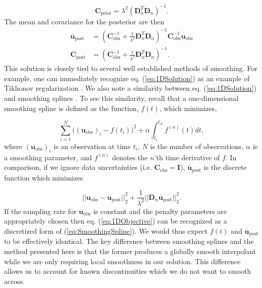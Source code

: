 \documentclass[10pt,a4paper]{article}
\begin{document}
\begin{equation}\label{eq:ExplicitPrior1D}
\mathbf{C_\mathrm{prior}} = \lambda^2(\mathbf{D}_n^T\mathbf{D}_n)^{-1}.
\end{equation}
The mean and covariance for the posterior are then 
\begin{equation}\label{eq:1DSolution}
\begin{split}
\mathbf{\bar{u}}_\mathrm{post} &= (\mathbf{C}_\mathrm{obs}^{-1} +   
                   \frac{1}{\lambda^2}\mathbf{D}_n^T\mathbf{D}_n)^{-1}\mathbf{C}_\mathrm{obs}^{-1}
                   \mathbf{u}_\mathrm{obs}
\\
\mathbf{C}_\mathrm{post} &= (\mathbf{C}_\mathrm{obs}^{-1} +   
                            \frac{1}{\lambda^2}\mathbf{D}_n^T\mathbf{D}_n)^{-1}.
\end{split}
\end{equation}
This solution is closely tied to several well established methods of smoothing.  For example, one can immediately recognize eq. (\ref{eq:1DSolution}) as an example of Tikhonov regularization \citep{Tikhonov1978}. We also note a similarity between eq. (\ref{eq:1DSolution}) and smoothing splines \citep{Wahba1990}.  To see this similarity, recall that a one-dimensional smoothing spline is defined as the function, $f(t)$, which minimizes,

\begin{equation}\label{eq:SmoothingSpline}
\sum_{i=1}^N \big((\mathbf{u_\mathrm{obs}})_i - f(t_i)\big)^2 + \alpha \int_{t_1}^{t_N} f^{(n)}(t) dt,
\end{equation}
where $(\mathbf{u_\mathrm{obs}})_i$ is an observation at time $t_i$, $N$ is the number of observations, $\alpha$ is a smoothing parameter, and $f^{(n)}$ denotes the $n$'th time derivative of $f$.
In comparison, if we ignore data uncertainties (i.e. $\mathbf{C}_\mathrm{obs}=\mathbf{I}$), $\mathbf{\bar{u}}_\mathrm{post}$ is the discrete function which minimizes  

\begin{equation}\label{eq:1DObjective}
||\mathbf{u}_\mathrm{obs} - \mathbf{\bar{u}}_\mathrm{post}||_2^2 + \frac{1}{\lambda^2}||\mathbf{D}_n\mathbf{\bar{u}}_\mathrm{post}||_2^2.
\end{equation} 
If the sampling rate for $\mathbf{u}_\mathrm{obs}$ is constant and the penalty parameters are appropriately chosen then eq. (\ref{eq:1DObjective}) can be recognized as a discretized form of (\ref{eq:SmoothingSpline}).  We would thus expect $f(t)$ and $\mathbf{\bar{u}}_\mathrm{post}$ to be effectively identical.  The key difference between smoothing splines and the method presented here is that the former produces a globally smooth interpolant while we are only requiring local smoothness in our solution.  This difference allows us to account for known discontinuities which we do not want to smooth across.    
\end{document}
